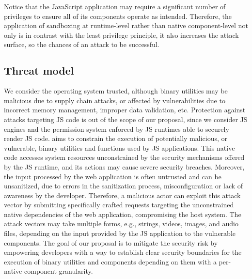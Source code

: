  \vspace{2 mm}
  \noindent Notice that the JavaScript application may require a
  significant number of privileges to ensure all of its components
  operate as intended. Therefore, the application of sandboxing at
  runtime-level rather than native component-level not only is in
  contrast with the least privilege principle, it also increases the
  attack surface, so the chances of an attack to be successful.  

\subsection{Threat model}
\label{sect:threat-model}

We consider the operating system trusted, although binary utilities
may be malicious due to supply chain attacks, or affected by
vulnerabilities due to incorrect memory management, improper data
validation, etc. Protection against attacks targeting JS code is out
of the scope of our proposal, since we consider JS engines and the
permission system enforced by JS runtimes able to securely render JS
code. \natisand aims to constrain the execution of potentially malicious, or vulnerable,
binary utilities and functions used by JS applications.  This native
code accesses system resources unconstrained by the security
mechanisms offered by the JS runtime, and its actions may
cause severe security breaches. Moreover, the input processed by the
web application is often untrusted and can be unsanitized, due to
errors in the sanitization process, misconfiguration or lack of
awareness by the developer.  Therefore, a malicious actor can exploit
this attack vector by submitting specifically crafted requests
targeting the unconstrained native dependencies of the web
application, compromising the host system. The attack vectors may take
multiple forms, e.g., strings, videos, images, and audio files,
depending on the input provided by the JS application to the
vulnerable components. The goal of our proposal is to mitigate the
security risk by
empowering developers with a way to establish clear security
boundaries for the execution of binary utilities and components
depending on them with a per-native-component granularity.

